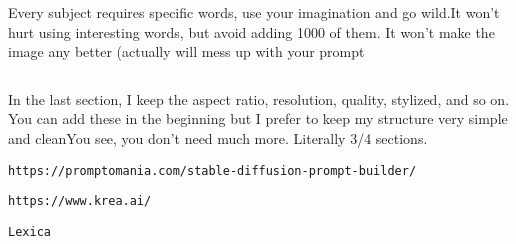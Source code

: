                  
                 
                  \protect\hypertarget{ID_1668512665}{}{}

\begin{verbatim}
\end{verbatim}

                  Every subject requires specific words, use your
                  imagination and go wild.It won't hurt using
                  interesting words, but avoid adding 1000 of them. It
                  won't make the image any better (actually will mess up
                  with your prompt
                 

                 
                 
                  \protect\hypertarget{ID_1189167452}{}{}

\begin{verbatim}
\end{verbatim}

                  In the last section, I keep the aspect ratio,
                  resolution, quality, stylized, and so on. You can add
                  these in the beginning but I prefer to keep my
                  structure very simple and cleanYou see, you don't need
                  much more. Literally 3/4 sections.
                 
               

               
               
                \protect\hypertarget{ID_1322635981}{}{}

\begin{verbatim}
https://promptomania.com/stable-diffusion-prompt-builder/
\end{verbatim}
               

               
               
                \protect\hypertarget{ID_879164612}{}{}

\begin{verbatim}
https://www.krea.ai/
\end{verbatim}
               

               
               
                \protect\hypertarget{ID_171638226}{}{}

\begin{verbatim}
Lexica
\end{verbatim}
               

               
               
                \protect\hypertarget{ID_1024033041}{}{}

